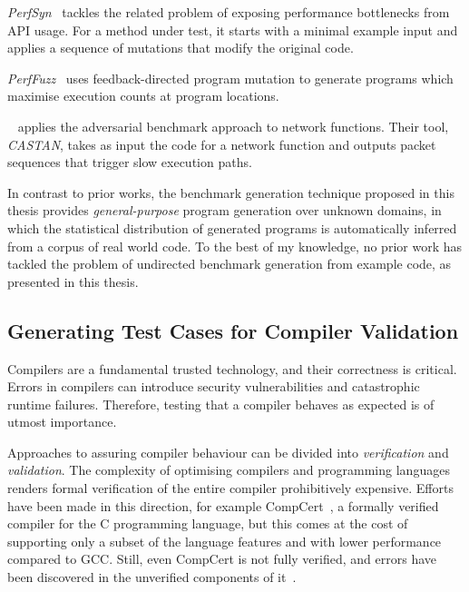 \emph{PerfSyn}~\cite{Toffola2018} tackles the related problem of exposing performance bottlenecks from API usage. For a method under test, it starts with a minimal example input and applies a sequence of mutations that modify the original code.

\emph{PerfFuzz}~\cite{Lemieux2018} uses feedback-directed program mutation to generate programs which maximise execution counts at program locations.

\citeauthor{Pedrosa2018}~\cite{Pedrosa2018} applies the adversarial benchmark approach to network functions. Their tool, \emph{CASTAN}, takes as input the code for a network function and outputs packet sequences that trigger slow execution paths.

In contrast to prior works, the benchmark generation technique proposed in this thesis provides \emph{general-purpose} program generation over unknown domains, in which the statistical distribution of generated programs is automatically inferred from a corpus of real world code. To the best of my knowledge, no prior work has tackled the problem of undirected benchmark generation from example code, as presented in this thesis.


\subsection{Generating Test Cases for Compiler Validation}

Compilers are a fundamental trusted technology, and their correctness is critical. Errors in compilers can introduce security vulnerabilities and catastrophic runtime failures. Therefore, testing that a compiler behaves as expected is of utmost importance.

Approaches to assuring compiler behaviour can be divided into \emph{verification} and \emph{validation}. The complexity of optimising compilers and programming languages renders formal verification of the entire compiler prohibitively expensive. Efforts have been made in this direction, for example CompCert~\cite{Leroy2013}, a formally verified compiler for the C programming language, but this comes at the cost of supporting only a subset of the language features and with lower performance compared to GCC. Still, even CompCert is not fully verified, and errors have been discovered in the unverified components of it~\cite{Yang2011}.

